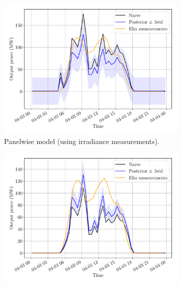 \documentclass[a4paper, 12pt]{article}
\begin{document}
\begin{figure}[H]
	\centering
	\begin{subfigure}{0.48\textwidth}
		\centering
		\includegraphics[width=\textwidth]{resources/pdf/solar_panelwise_meas_meas (START_FOR 03-04-2020).pdf}
		\vspace{-0.5em}
		\caption{Panelwise model (using irradiance measurements).}
	\end{subfigure}
	\hspace{0.5em}
	\begin{subfigure}{0.48\textwidth}
		\centering
		\includegraphics[width=\textwidth]{resources/pdf/solar_provincial_meas_meas (START_FOR 03-04-2020).pdf}
		\vspace{-0.5em}

\end{subfigure}
\end{figure}
\end{document}
